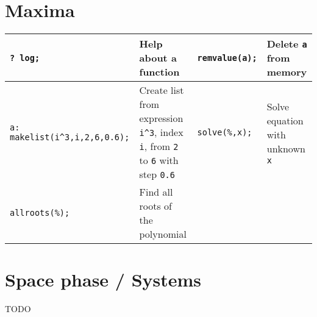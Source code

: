 \documentclass{form}
\begin{document}
\section*{Maxima}
\begin{center} \begin{tabular}{l p{52mm} | l p{52mm}}
    \texttt{? log;} & Help about a function & \texttt{remvalue(a);} & Delete \texttt{a} from memory \\ \hline
    \texttt{a: makelist(i\^{}3,i,2,6,0.6);} & Create list from expression \texttt{i\^{}3}, index \texttt{i}, from \texttt{2} to \texttt{6} with step \texttt{0.6} & \texttt{solve(\%,x);} & Solve equation with unknown \texttt{x} \\ \hline
    \texttt{allroots(\%);} & Find all roots of the polynomial & & 
\end{tabular} \end{center}
\newpage
\section*{Space phase / Systems}

TODO
\end{document}
